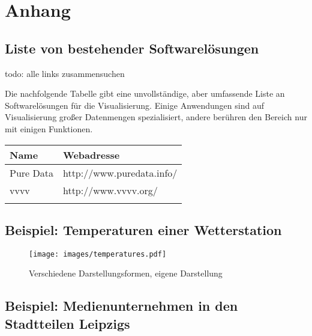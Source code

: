 \documentclass[a4paper, 12pt, DIV=calc, version=first, pdftex, headsepline, footsepline, bibtotocnumbered, liststotocnumbered]{scrreprt}
\begin{document}
\chapter{Anhang}
\section{Liste von bestehender Softwarelösungen}
todo: alle links zusammensuchen

Die nachfolgende Tabelle gibt eine unvollständige, aber umfassende
Liste an Softwarelösungen für die Visualisierung. Einige Anwendungen
sind auf Visualisierung großer Datenmengen spezialisiert, andere
berühren den Bereich nur mit einigen Funktionen.

\begin{tabular}{l|l}
\hline
Name & Webadresse \\
\hline
Pure Data & http://www.puredata.info/ \\
vvvv & http://www.vvvv.org/ \\
\label{tab:Softwareliste}
\end{tabular}
\section{Beispiel: Temperaturen einer Wetterstation}
\label{sec:temperatures}
\begin{figure}
\centering
\texttt{[image: images/temperatures.pdf]}
\caption{Verschiedene Darstellungsformen, eigene Darstellung}
\label{fig:temperatures}
\end{figure}
\section{Beispiel: Medienunternehmen in den Stadtteilen Leipzigs}
\label{sec:companyclash}


\listoftables
\listoffigures
\end{document}
